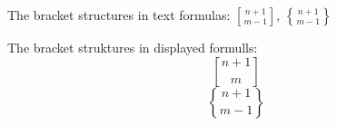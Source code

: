 \documentclass{article}
\newcommand{\Lbrack}[2]{#1\brack #2}
\newcommand{\Lbrace}[2]{#1\brace #2}
\begin{document}
\noindent
The bracket structures in text formulas:
$\Lbrack{n+1}{m-1}$,
$\Lbrace{n+1}{m-1}$

\noindent The bracket struktures in displayed formulls:
\[ \Lbrack{n+1}{m} \] 
\[ \Lbrace{n+1}{m-1} \]
\end{document}
